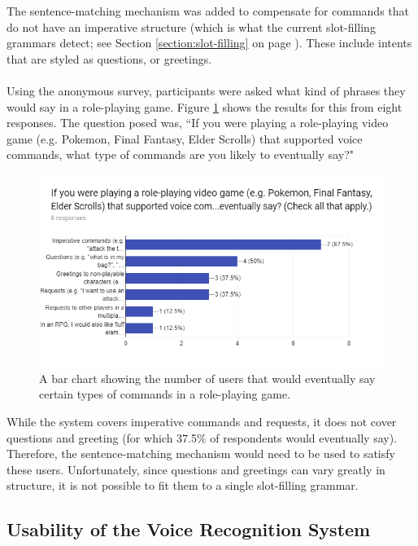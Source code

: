 \documentclass[11pt]{article}
\begin{document}
The sentence-matching mechanism was added to compensate for commands that do not have an imperative structure (which is what the current slot-filling grammars detect; see Section \ref{section:slot-filling} on page \pageref{section:slot-filling}). These include intents that are styled as questions, or greetings.
\\
\\
Using the anonymous survey, participants were asked what kind of phrases they would say in a role-playing game. Figure \ref{fig:survey-commands} shows the results for this from eight responses. The question posed was, ``If you were playing a role-playing video game (e.g. Pokemon, Final Fantasy, Elder Scrolls) that supported voice commands, what type of commands are you likely to eventually say?"

\begin{center}
\begin{figure}[]
\begin{center}
  \includegraphics[width=\linewidth]{survey-commands}
  \caption{A bar chart showing the number of users that would eventually say certain types of commands in a role-playing game.}
  \label{fig:survey-commands}
  \end{center}
\end{figure}
\end{center}

While the system covers imperative commands and requests, it does not cover questions and greeting (for which 37.5\% of respondents  would eventually say). Therefore, the sentence-matching mechanism would need to be used to satisfy these users. Unfortunately, since questions and greetings can vary greatly in structure, it is not possible to fit them to a single slot-filling grammar.

\subsection{Usability of the Voice Recognition System}
\end{document}
